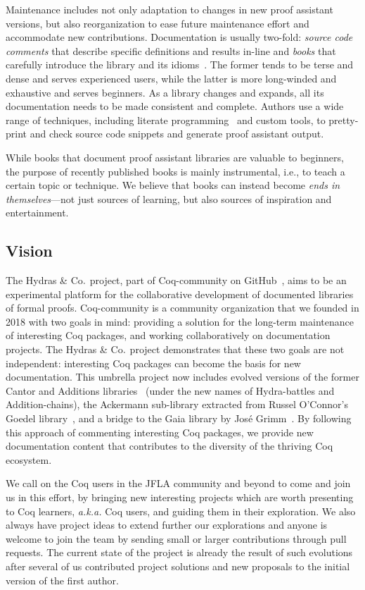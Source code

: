 \documentclass{easychair}
\newcommand{\coq}{Coq\xspace}
\newcommand{\community}{Coq-community\xspace}
\newcommand{\gaia}{Gaia\xspace}
\newcommand{\Hydras}{Hydras \& Co$\text.$\xspace}
\begin{document}
Maintenance includes not only adaptation to changes in new proof assistant versions, but also reorganization to ease future maintenance effort and accommodate new contributions. Documentation is usually two-fold: \emph{source code comments} that describe specific definitions and results in-line and \emph{books} that carefully introduce the library and its idioms~\cite{MCB}. The former tends to be terse and dense and serves experienced users, while the latter is more long-winded and exhaustive and serves beginners. As a library changes and expands, all its documentation needs to be made consistent and complete. Authors use a wide range of techniques, including literate programming~\cite{Knuth1984} and custom tools, to pretty-print and check source code snippets and generate proof assistant output.

While books that document proof assistant libraries are valuable to beginners, the purpose of recently published books is mainly instrumental, i.e., to teach a certain topic or technique. We believe that books can instead become \emph{ends in themselves}---not just sources of learning, but also sources of inspiration and entertainment.

\subsection{Vision}
The \Hydras project, part of \community on GitHub~\cite{CoqCommunity}, aims to be an experimental platform for the collaborative development of documented libraries of formal proofs. \community is a community organization that we founded in 2018 with two goals in mind: providing a solution for the long-term maintenance of interesting \coq packages, and working collaboratively on documentation projects. The \Hydras project demonstrates that these two goals are not independent: interesting \coq packages can become the basis for new documentation.
%
This umbrella project now includes evolved versions of the former Cantor and Additions libraries~\cite{CantorContrib,AdditionsContrib} (under the new names of Hydra-battles and Addition-chains), the Ackermann sub-library extracted from Russel O'Connor's Goedel library~\cite{OConnor05, Goedel}, and a bridge to the \gaia library by José Grimm~\cite{Gaia,grimm:hal-00911710}.
%
By following this approach of commenting interesting \coq packages, we provide new documentation content that contributes to the diversity of the thriving \coq ecosystem.

We call on the \coq users in the JFLA community and beyond to come and join us in this effort, by bringing new interesting projects which are worth presenting to \coq learners, \emph{a.k.a.} \coq users, and guiding them in their exploration.
%
We also always have project ideas to extend further our explorations and anyone is welcome to join the team by sending small or larger contributions through pull requests.
%
The current state of the project is already the result of such evolutions after several of us contributed project solutions and new proposals to the initial version of the first author.
\end{document}
